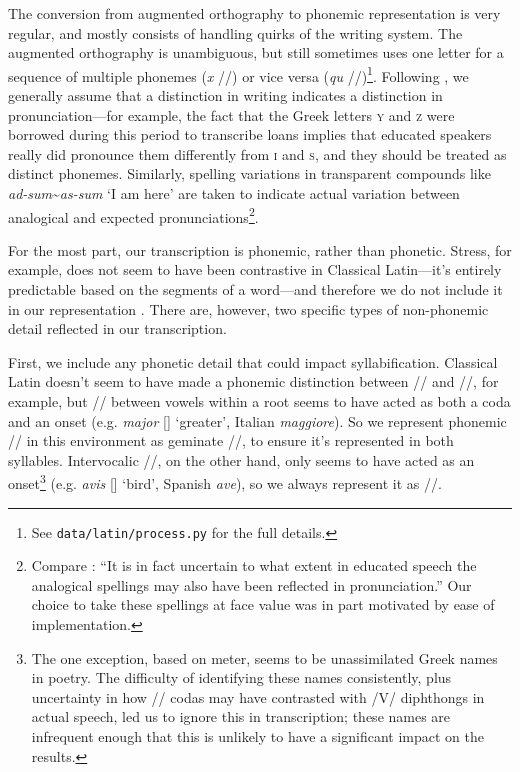 \documentclass[12pt,twoside]{article}
\newcommand{\ipa}[1]{/\textipa{#1}/}
\newcommand{\ipab}[1]{[\textipa{#1}]}
\begin{document}

The conversion from augmented orthography to phonemic representation is very regular, and mostly consists of handling quirks of the writing system. The augmented orthography is unambiguous, but still sometimes uses one letter for a sequence of multiple phonemes (\emph{x} \ipa{ks}) or vice versa (\emph{qu} \ipa{k\super{w}})\footnote{See \texttt{data/latin/process.py} for the full details.}. Following \citet{allen}, we generally assume that a distinction in writing indicates a distinction in pronunciation---for example, the fact that the Greek letters \textsc{y} and \textsc{z} were borrowed during this period to transcribe loans implies that educated speakers really did pronounce them differently from \textsc{i} and \textsc{s}, and they should be treated as distinct phonemes. Similarly, spelling variations in transparent compounds like \emph{ad-sum}\textasciitilde\emph{as-sum} `I am here' are taken to indicate actual variation between analogical and expected pronunciations\footnote{Compare \citet[22]{allen}: ``It is in fact uncertain to what extent in educated speech the analogical spellings may also have been reflected in pronunciation.'' Our choice to take these spellings at face value was in part motivated by ease of implementation.}.

For the most part, our transcription is phonemic, rather than phonetic. Stress, for example, does not seem to have been contrastive in Classical Latin---it's entirely predictable based on the segments of a word---and therefore we do not include it in our representation \parencites[83]{allen}[I.5.30]{quintilian}. There are, however, two specific types of non-phonemic detail reflected in our transcription.

First, we include any phonetic detail that could impact syllabification. Classical Latin doesn't seem to have made a phonemic distinction between \ipa{j} and \ipa{jj}, for example, but \ipa{j} between vowels within a root seems to have acted as both a coda and an onset (e.g. \emph{major} \ipab{maj.jor} `greater', Italian \emph{maggiore}). So we represent phonemic \ipa{j} in this environment as geminate \ipa{jj}, to ensure it's represented in both syllables. Intervocalic \ipa{w}, on the other hand, only seems to have acted as an onset\footnote{The one exception, based on meter, seems to be unassimilated Greek names in poetry. The difficulty of identifying these names consistently, plus uncertainty in how \ipa{w} codas may have contrasted with /V/ diphthongs in actual speech, led us to ignore this in transcription; these names are infrequent enough that this is unlikely to have a significant impact on the results.} (e.g. \emph{avis} \ipab{a.wis} `bird', Spanish \emph{ave}), so we always represent it as \ipa{w}.
\end{document}
